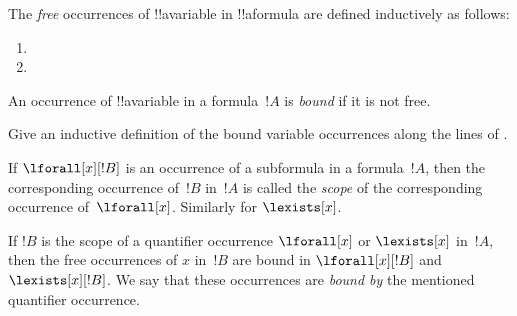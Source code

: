 
\begin{defn}
The \emph{free} occurrences of !!a{variable} in !!a{formula} are defined
inductively as follows:
\begin{enumerate}
\item {}


\item {}


\end{enumerate}
\end{defn}

\begin{defn}
An occurrence of !!a{variable} in a formula~$!A$ is \emph{bound} if
it is not free.
\end{defn}

\begin{prob}
Give an inductive definition of the bound variable occurrences along
the lines of .
\end{prob}

\begin{defn}[Scope]
If $\lforall[x][!B]$ is an occurrence of a subformula
  in a formula~$!A$, then the corresponding occurrence of~$!B$ in~$!A$
  is called the \emph{scope} of the corresponding occurrence
  of~$\lforall[x]$. Similarly for $\lexists[x]$.

If $!B$ is the scope of a quantifier occurrence
$\lforall[x]$ or
    $\lexists[x]$ in~$!A$, then the free occurrences of
$x$ in~$!B$ are bound in $\lforall[x][!B]$ and
$\lexists[x][!B]$. We say that these
occurrences are \emph{bound by} the
mentioned quantifier occurrence.
\end{defn}

